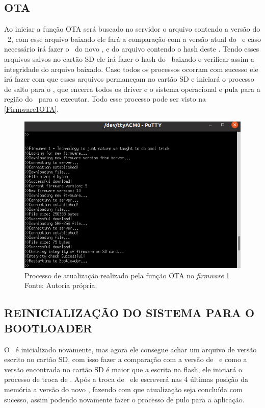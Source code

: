 \subsection{OTA}
Ao iniciar a função OTA será buscado no servidor o arquivo contendo a versão do \firmware\ 2, com esse arquivo baixado ele fará a comparação com a versão atual do \firmware\ e caso necessário irá fazer o \download\ do novo \firmware, e do arquivo contendo o hash deste \firmware. Tendo esses arquivos salvos no cartão SD ele irá fazer o hash do \firmware\ baixado e verificar assim a integridade do arquivo baixado. Caso todos os processos ocorram com sucesso ele irá fazer com que esses arquivos permaneçam no cartão SD e iniciará o processo de salto para o \bootloader, que encerra todos os driver e o sistema operacional e pula para a região do \bootloader\ para o executar. Todo esse processo pode ser visto na \autoref{Firmware1OTA}.

\begin{figure}[H]
    \scriptsize
     \centering
     \includegraphics[scale=0.9]{dados/figuras/Firmware1.png}
     \caption{Processo de atualização realizado pela função OTA no \textit{firmware} 1 \newline Fonte: Autoria própria.}
     \label{Firmware1OTA}
\end{figure}

\subsection{REINICIALIZAÇÃO DO SISTEMA PARA O BOOTLOADER}
O \bootloader\ é inicializado novamente, mas agora ele consegue achar um arquivo de versão escrito no cartão SD, com isso fazer a comparação com a versão de \firmware\ e como a versão encontrada no cartão SD é maior que a escrita na flash, ele iniciará o processo de troca de \firmware.
Após a troca de \firmware\ ele escreverá nas 4 últimas posição da memória a versão do novo \firmware, fazendo com que atualização seja concluída com sucesso, assim podendo novamente fazer o processo de pulo para a aplicação.

